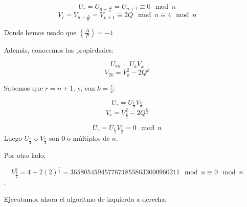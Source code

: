 \documentclass[a4paper]{article}
\begin{document}
$$U_r = U_{n-\frac{\Delta}{n}}=U_{n+1}\equiv 0\mod n$$
$$V_r = V_{n-\frac{\Delta}{n}}=V_{n+1}\equiv 2Q\mod n\equiv 4\mod n$$

Donde hemos usado que $\left( \frac{\Delta}{P}\right) = -1$

Además, conocemos las propiedades:

$$U_{2k}=U_kV_k$$
$$V_{2k}=V_k^2-2Q^k$$

Sabemos que $r=n+1$, y, con $k=\frac{r}{2}$:

$$U_r=U_{\frac{r}{2}}V_{\frac{r}{2}}$$
$$V_r=V_{\frac{r}{2}}^2-2Q^{\frac{r}{2}}$$

$$U_r=U_{\frac{r}{2}}V_{\frac{r}{2}}= 0 \mod n$$
Luego $U_{\frac{r}{2}}$ o $V_{\frac{r}{2}}$ son 0 o múltiplos de $n$.

Por otro lado, 

$$V_{\frac{r}{2}}^2=4+2(2)^{\frac{r}{2}}=36580545945776718558633000960211 \mod n \equiv 0 \mod n$$.

Ejecutamos ahora el algoritmo de izquierda a derecha:
\end{document}
